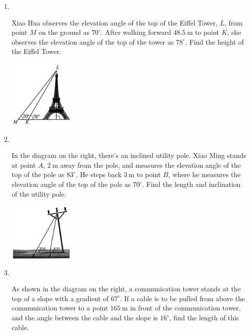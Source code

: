 \documentclass{report}
\begin{document}
    \newpage
    \begin{enumerate}
        \item \parbox[t]{0.9\textwidth}{
            ~
            \vspace{-1.1em}
            \begin{vwcol}[widths={0.6,0.4}, sep=8mm, rule=0pt]
                Xiao Hua observes the elevation angle of the top of the Eiffel Tower, $L$, from point $M$ on the ground as $70^\circ$. After walking forward $48.5 \mathrm{~m}$ to point $K$, she observes the elevation angle of the top of the tower as $78^\circ$. Find the height of the Eiffel Tower.
    
                \includegraphics[width=0.25\textwidth]{assets/10-68.jpg}
            \end{vwcol}
        }

        \vspace{3em}
        \item \parbox[t]{0.9\textwidth}{
            ~
            \vspace{-1.1em}
            \begin{vwcol}[widths={0.6,0.4}, sep=8mm, rule=0pt]
                In the diagram on the right, there's an inclined utility pole. Xiao Ming stands at point $A$, $2 \mathrm{~m}$ away from the pole, and measures the elevation angle of the top of the pole as $83^\circ$. He steps back $3 \mathrm{~m}$ to point $B$, where he measures the elevation angle of the top of the pole as $70^\circ$. Find the length and inclination of the utility pole.
    
                \includegraphics[width=0.25\textwidth]{assets/10-69.jpg}
            \end{vwcol}
        }

        \vspace{2em}    
        \item \parbox[t]{0.9\textwidth}{
            ~
            \vspace{-1.1em}
            \begin{vwcol}[widths={0.6,0.4}, sep=8mm, rule=0pt]
                As shown in the diagram on the right, a communication tower stands at the top of a slope with a gradient of $67^\circ$. If a cable is to be pulled from above the communication tower to a point $165 \mathrm{~m}$ in front of the communication tower, and the angle between the cable and the slope is $16^\circ$, find the length of this cable.
    

\end{vwcol}}
\end{enumerate}
\end{document}
